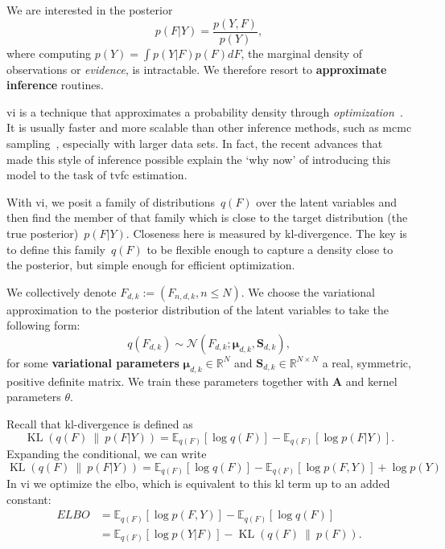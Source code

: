 We are interested in the posterior
\begin{equation}
  p(F|Y) = \frac{p(Y,F)}{p(Y)},
\end{equation}
where computing $p(Y) = \int p(Y|F)p(F)dF$, the marginal density of observations or \emph{evidence}, is intractable.
We therefore resort to \textbf{approximate inference} routines.

\Gls{vi} is a technique that approximates a probability density through \emph{optimization}~\parencite{Jordan1999, Hoffman2015, Blei2017}.
It is usually faster and more scalable than other inference methods, such as \gls{mcmc} sampling~\parencite[as used in e.g.][]{Fox2011}, especially with larger data sets.
In fact, the recent advances that made this style of inference possible explain the `why now' of introducing this model to the task of \gls{tvfc} estimation.

With \gls{vi}, we posit a family of distributions~$q(F)$ over the latent variables and then find the member of that family which is close to the target distribution (the true posterior)~$p(F|Y)$.
Closeness here is measured by \gls{kl-divergence}.
The key is to define this family~$q(F)$ to be flexible enough to capture a density close to the posterior, but simple enough for efficient optimization.

We collectively denote $F_{d,k} := (F_{n,d,k}, n \leq N)$.
We choose the variational approximation to the posterior distribution of the latent variables to take the following form:
\begin{equation}
  q(F_{d,k}) \sim \mathcal{N}(F_{d,k};\boldsymbol{\mu}_{d,k}, \mathbf{S}_{d,k}),
\end{equation}
for some \textbf{variational parameters} $\boldsymbol{\mu}_{d,k} \in \mathbb{R}^N$ and $\mathbf{S}_{d,k} \in \mathbb{R}^{N \times N}$ a real, symmetric, positive definite matrix.
We train these parameters together with $\mathbf{A}$ and kernel parameters $\theta$.

Recall that \gls{kl-divergence} is defined as
\begin{equation}
  \operatorname{KL}(q(F)~\|~p(F | Y)) = \mathbb{E}_{q(F)}[\log q(F)] - \mathbb{E}_{q(F)}[\log p(F | Y)].
\end{equation}
Expanding the conditional, we can write
\begin{equation}
  \operatorname{KL}(q(F)~\|~p(F | Y)) = \mathbb{E}_{q(F)}[\log q(F)] - \mathbb{E}_{q(F)}[\log p(F, Y)] + \log p(Y)
\end{equation}
In \gls{vi} we optimize the \gls{elbo}, which is equivalent to this \gls{kl} term up to an added constant:
\begin{equation}
  \begin{split}
    ELBO & = \mathbb{E}_{q(F)}[\log p(F, Y)] - \mathbb{E}_{q(F)}[\log q(F)] \\
    & = \mathbb{E}_{q(F)}[\log p(Y|F)] - \operatorname{KL}(q(F)~\|~p(F)).
  \end{split}
\end{equation}

